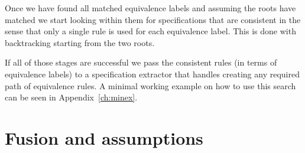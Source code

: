Once we have found all matched equivalence labels and assuming the roots have matched we start looking within them for specifications that are consistent in the sense that only a single rule is used for each equivalence label. This is done with backtracking starting from the two roots.

If all of those stages are successful we pass the consistent rules (in terms of equivalence labels) to a specification extractor that handles creating any required path of equivalence rules. A minimal working example on how to use this search can be seen in Appendix~\ref{ch:minex}.


\section{Fusion and assumptions}
